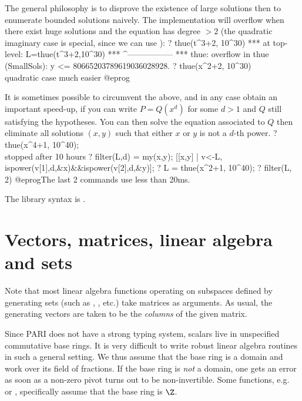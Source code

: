  The general philosophy is to disprove the existence of large
solutions then to enumerate bounded solutions naively. The implementation
will overflow when there exist huge solutions and the equation has degree
$> 2$ (the quadratic imaginary case is special, since we can use
):
\bprog
? thue(t^3+2, 10^30)
 ***   at top-level: L=thue(t^3+2,10^30)
 ***                   ^-----------------
 *** thue: overflow in thue (SmallSols): y <= 80665203789619036028928.
? thue(x^2+2, 10^30)  \\ quadratic case much easier
@eprog

 It is sometimes possible to circumvent the above, and in any
case obtain an important speed-up, if you can write $P = Q(x^d)$ for some $d >
1$ and $Q$ still satisfying the  hypotheses. You can then solve
the equation associated to $Q$ then eliminate all solutions $(x,y)$ such that
either $x$ or $y$ is not a $d$-th power.
\bprog
? thue(x^4+1, 10^40); \\ stopped after 10 hours
? filter(L,d) =
    my(x,y); [[x,y] | v<-L, ispower(v[1],d,&x)&&ispower(v[2],d,&y)];
? L = thue(x^2+1, 10^40);
? filter(L, 2)
@eprog\noindent The last 2 commands use less than 20ms.

The library syntax is .

\section{Vectors, matrices, linear algebra and sets}
\label{se:linear_algebra}

Note that most linear algebra functions operating on subspaces defined by
generating sets (such as , , etc.) take matrices as
arguments. As usual, the generating vectors are taken to be the
\emph{columns} of the given matrix.

Since PARI does not have a strong typing system, scalars live in
unspecified commutative base rings. It is very difficult to write
robust linear algebra routines in such a general setting. We thus
assume that the base ring is a domain and work over its field of
fractions. If the base ring is \emph{not} a domain, one gets an error as soon
as a non-zero pivot turns out to be non-invertible. Some functions,
e.g.~ or , specifically assume that the base ring is
$\Z$.


